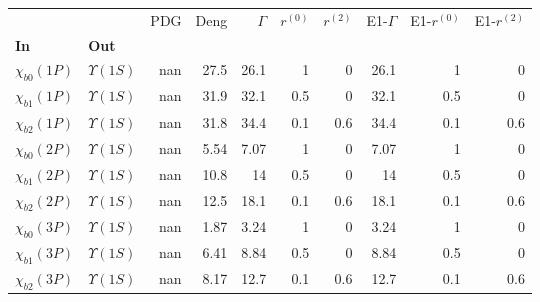 \begin{tabular}{l|l|r|r|r|r|r|r|r|r}
\toprule
                &                &  PDG &  Deng &  $\Gamma$ &  $r^{(0)}$ &  $r^{(2)}$ &  E1-$\Gamma$ &  E1-$r^{(0)}$ &  E1-$r^{(2)}$ \\
\textbf{In} & \textbf{Out} &      &       &           &            &            &              &               &               \\
\midrule
\textbf{$\chi_{b0}(1P)$} & \textbf{$\Upsilon(1S)$} &  nan &  27.5 &      26.1 &          1 &          0 &         26.1 &             1 &             0 \\
\textbf{$\chi_{b1}(1P)$} & \textbf{$\Upsilon(1S)$} &  nan &  31.9 &      32.1 &        0.5 &          0 &         32.1 &           0.5 &             0 \\
\textbf{$\chi_{b2}(1P)$} & \textbf{$\Upsilon(1S)$} &  nan &  31.8 &      34.4 &        0.1 &        0.6 &         34.4 &           0.1 &           0.6 \\
\textbf{$\chi_{b0}(2P)$} & \textbf{$\Upsilon(1S)$} &  nan &  5.54 &      7.07 &          1 &          0 &         7.07 &             1 &             0 \\
\textbf{$\chi_{b1}(2P)$} & \textbf{$\Upsilon(1S)$} &  nan &  10.8 &        14 &        0.5 &          0 &           14 &           0.5 &             0 \\
\textbf{$\chi_{b2}(2P)$} & \textbf{$\Upsilon(1S)$} &  nan &  12.5 &      18.1 &        0.1 &        0.6 &         18.1 &           0.1 &           0.6 \\
\textbf{$\chi_{b0}(3P)$} & \textbf{$\Upsilon(1S)$} &  nan &  1.87 &      3.24 &          1 &          0 &         3.24 &             1 &             0 \\
\textbf{$\chi_{b1}(3P)$} & \textbf{$\Upsilon(1S)$} &  nan &  6.41 &      8.84 &        0.5 &          0 &         8.84 &           0.5 &             0 \\
\textbf{$\chi_{b2}(3P)$} & \textbf{$\Upsilon(1S)$} &  nan &  8.17 &      12.7 &        0.1 &        0.6 &         12.7 &           0.1 &           0.6 \\
\bottomrule
\end{tabular}
